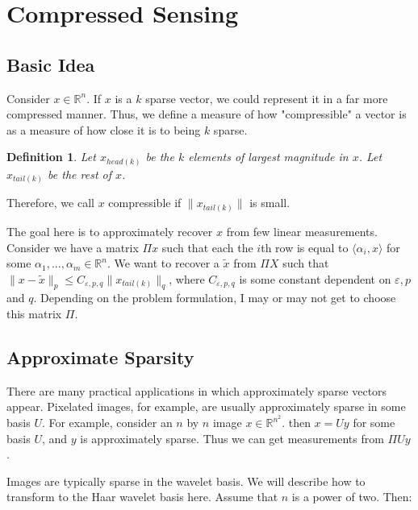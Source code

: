 \documentclass[11pt]{article}
\newcommand{\eps}{\varepsilon}
\newcommand{\R}{\mathbb{R}}
\newtheorem{definition}[theorem]{Definition}
\begin{document}
\section{Compressed Sensing}

\subsection{Basic Idea}
Consider $x \in \R^n$. If $x$ is a $k$ sparse vector, we could represent it in a far more compressed manner. Thus, we define a measure of how "compressible" a vector is as a measure of how close it is to being $k$ sparse.

\begin{definition}
Let $x_{head(k)}$ be the $k$ elements of largest magnitude in $x$. Let $x_{tail(k)}$ be the rest of $x$.
\end{definition}

Therefore, we call $x$ compressible if $\| x_{tail(k)} \|$ is small.

The goal here is to approximately recover $x$ from few linear measurements. Consider we have a matrix $\Pi x$ such that each the $i$th row is equal to $\langle \alpha_i, x\rangle$ for some $\alpha_1, ..., \alpha_m \in \R^n$. We want to recover a $\tilde{x}$ from $\Pi X$ such that $\|x - \tilde{x}\|_p \leq C_{\eps, p, q} \|x_{tail(k)}\|_q$, where $C_{\eps, p, q}$ is some constant dependent on $\eps, p$ and $q$. Depending on the problem formulation, I may or may not get to choose this matrix $\Pi$.

\subsection{Approximate Sparsity}
There are many practical applications in which approximately sparse vectors appear. Pixelated images, for example, are usually approximately sparse in some basis $U$. For example, consider an $n$ by $n$ image $x \in \R^{n^2}$. then $x = Uy$ for some basis $U$, and $y$ is approximately sparse. Thus we can get measurements from $\Pi Uy$.

Images are typically sparse in the wavelet basis. We will describe how to transform to the Haar wavelet basis here. Assume that $n$ is a power of two. Then:
\end{document}
